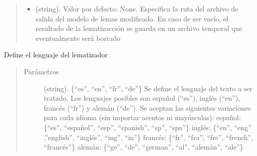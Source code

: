 \documentclass[letterpaper,10pt,openany,spanish]{sphinxmanual}
\begin{document}
\begin{fulllineitems}
\begin{quote}
\begin{description}
\begin{itemize}
\item {} 
 \textendash{} (string). Valor por defecto: None. Especifica la ruta             del archivo de salida del modelo de lemas modificado. En caso de ser             vacío, el resultado de la lematizacción se guarda en un archivo             temporal que eventualmente será borrado

\end{itemize}

\end{description}\end{quote}

\begin{fulllineitems}
\label{\detokenize{funciones/lematizacion:lematizacion.LematizadorStanza.establecer_lenguaje}}
Define el lenguaje del lematizador
\begin{quote}\begin{description}
\item[{Parámetros}] \leavevmode
{} \textendash{} (string). \{“es”, “en”, “fr”, “de”\}  Se define el             lenguaje del texto a ser tratado. Los lenguajes posibles son español             (“es”), inglés (“en”), francés (“fr”) y alemán (“de”). Se aceptan las             siguientes variaciones para cada idioma (sin importar acentos ni mayúsculas):                    español: \{“es”, “español”, “esp”, “spanish”, “sp”, “spa”\} 
 inglés: \{“en”, “eng” .”english”, “inglés”, “ing”, “in”\} 
 francés: \{“fr”, “fra”, “fre”, “french”, “francés”\} 
 alemán: \{“ge”, “de”, “german”, “al”, “alemán”, “ale”\}   

\end{description}\end{quote}

\end{fulllineitems}



\end{fulllineitems}
\end{document}
